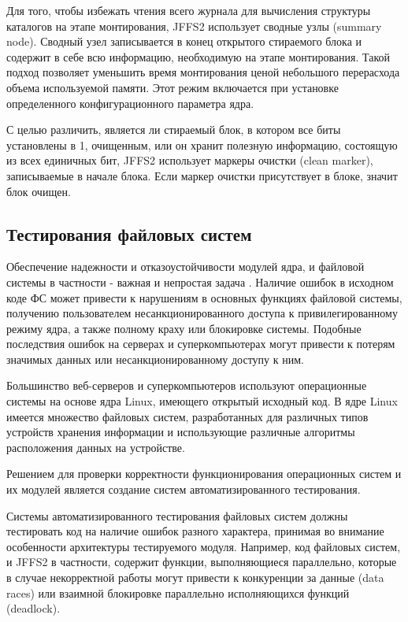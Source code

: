 Для того, чтобы избежать чтения всего журнала для вычисления структуры каталогов на этапе монтирования, JFFS2 использует сводные узлы (summary node). Сводный узел записывается в конец открытого стираемого блока и содержит в себе всю информацию, необходимую на этапе монтирования. Такой подход позволяет уменьшить время монтирования ценой небольшого перерасхода объема используемой памяти. Этот режим включается при установке определенного конфигурационного параметра ядра.

С целью различить, является ли стираемый блок, в котором все биты установлены в 1, очищенным, или он хранит полезную информацию, состоящую из всех единичных бит, JFFS2 использует маркеры очистки (clean marker), записываемые в начале блока. Если маркер очистки присутствует в блоке, значит блок очищен.

\subsection{Тестирования файловых систем}

Обеспечение надежности и отказоустойчивости модулей ядра, и файловой системы в частности - важная и непростая задача \cite{ostesting}. Наличие ошибок в исходном коде ФС может привести к нарушениям в основных функциях файловой системы, получению пользователем несанкционированного доступа к привилегированному режиму ядра, а также полному краху или блокировке системы. Подобные последствия ошибок на серверах и суперкомпьютерах могут привести к потерям значимых данных или несанкционированному доступу к ним.

Большинство веб-серверов и суперкомпьютеров используют операционные системы на основе ядра Linux, имеющего открытый исходный код. В ядре Linux имеется множество файловых систем, разработанных для различных типов устройств хранения информации и использующие различные алгоритмы расположения данных на устройстве.

Решением для проверки корректности функционирования операционных систем и их модулей является создание систем автоматизированного тестирования.  

Системы автоматизированного тестирования файловых систем должны тестировать код на наличие ошибок разного характера, принимая во внимание особенности архитектуры тестируемого модуля. Например, код файловых систем, и JFFS2 в частности, содержит функции, выполняющиеся параллельно, которые в случае некорректной работы могут привести к конкуренции за данные (data races) или взаимной блокировке параллельно исполняющихся функций (deadlock).

